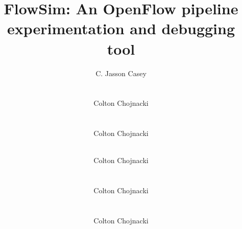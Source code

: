 \documentclass[conference]{sig-alternate}
\begin{document}
\title{FlowSim: An OpenFlow pipeline experimentation and debugging tool}

\author{
  \alignauthor C. Jasson Casey \\
       \\
       \\
  \alignauthor Colton Chojnacki \\
      \\
      \\
  \alignauthor Colton Chojnacki \\
     \\
\and
  \alignauthor Colton Chojnacki \\
     \\
    \\
  \alignauthor Colton Chojnacki \\
     \\
    \\
  \alignauthor Colton Chojnacki \\
     \\
}

\maketitle

\begin{abstract}
  
\end{abstract}

  
  
  
  
  
  
  
  
\end{document}
